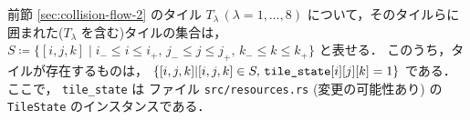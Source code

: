 {%
\subsubsection{}
\label{sec:collision-flow-3}

前節 \ref{sec:collision-flow-2} のタイル \(T_\lambda \, (\lambda = 1, \dots, 8)\)
について，そのタイルらに囲まれた(\(T_\lambda\) を含む)タイルの集合は，
\(S \coloneqq \{[i, j, k] \mid
  i_- \le i \le i_+, \, 
  j_- \le j \le j_+, \, 
  k_- \le k \le k_+ \}\)
と表せる．
このうち，タイルが存在するものは，
\(\{ [i, j, k] | [i, j, k] \in S, \, \verb|tile_state|[i][j][k] = 1\}\)
である．
ここで，
\verb|tile_state| は
ファイル \verb|src/resources.rs| (変更の可能性あり)
の \verb|TileState| のインスタンスである．

}
